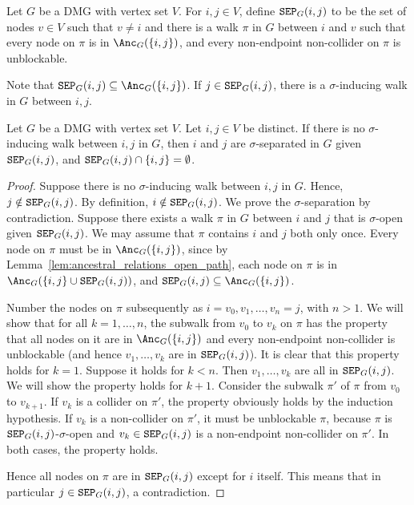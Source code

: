 \begin{Def}\label{def:DSEP}
  Let $G$ be a DMG with vertex set $V$. 
  For $i,j \in V$, define $\mathtt{SEP}_G(i,j)$ to be the set of nodes $v \in V$ such that
  $v \ne i$ and there is a walk $\pi$ in $G$ between $i$ and $v$ such that every node
  on $\pi$ is in $\Anc_G(\{i,j\})$, and 
  every non-endpoint non-collider on $\pi$ is unblockable.
\end{Def}
Note that $\SEP_G(i,j) \subseteq \Anc_G(\{i,j\})$.
If $j \in \mathtt{SEP}_G(i,j)$, there is a $\sigma$-inducing walk in $G$ between $i,j$.
\begin{Prp}\label{prp:DSEP}
  Let $G$ be a DMG with vertex set $V$.
  Let $i,j \in V$ be distinct.
  If there is no $\sigma$-inducing walk between $i,j$ in $G$, then $i$ and $j$ are $\sigma$-separated in $G$ given $\mathtt{SEP}_G(i,j)$,
  and $\mathtt{SEP}_G(i,j) \cap \{i,j\} = \emptyset$.
\end{Prp}
\begin{proof}
  Suppose there is no $\sigma$-inducing walk between $i,j$ in $G$.
  Hence, $j \notin \mathtt{SEP}_G(i,j)$.
  By definition, $i \notin \mathtt{SEP}_G(i,j)$.
  We prove the $\sigma$-separation by contradiction.
  Suppose there exists a walk $\pi$ in $G$ between $i$ and $j$ that is $\sigma$-open given $\mathtt{SEP}_G(i,j)$.
  We may assume that $\pi$ contains $i$ and $j$ both only once.
  Every node on $\pi$ must be in $\Anc_G(\{i,j\})$, since
  by Lemma~\ref{lem:ancestral_relations_open_path}, each node on $\pi$ is in $\Anc_G(\{i,j\} \cup \SEP_G(i,j))$,
  and $\SEP_G(i,j) \subseteq \Anc_G(\{i,j\})$.

  Number the nodes on $\pi$ subsequently as $i = v_0, v_1, \dots, v_n = j$, with $n > 1$.
  We will show that for all $k = 1,\dots,n$, the subwalk from $v_0$ to $v_k$ on $\pi$ has the property that all nodes on it are in $\Anc_G(\{i,j\})$ and every non-endpoint non-collider is unblockable (and hence $v_1,\dots,v_k$ are in $\mathtt{SEP}_G(i,j)$).
  It is clear that this property holds for $k=1$. 
  Suppose it holds for $k < n$.
  Then $v_1,\dots,v_k$ are all in $\mathtt{SEP}_G(i,j)$.
  We will show the property holds for $k+1$.
  Consider the subwalk $\pi'$ of $\pi$ from $v_0$ to $v_{k+1}$.
  If $v_{k}$ is a collider on $\pi'$, the property obviously holds by the induction hypothesis.
  If $v_{k}$ is a non-collider on $\pi'$, it must be unblockable $\pi$, because $\pi$ is $\mathtt{SEP}_G(i,j)$-$\sigma$-open and $v_k \in \mathtt{SEP}_G(i,j)$ is a non-endpoint non-collider on $\pi'$.
  In both cases, the property holds.

  Hence all nodes on $\pi$ are in $\mathtt{SEP}_G(i,j)$ except for $i$ itself.
  This means that in particular $j \in \mathtt{SEP}_G(i,j)$, a contradiction.
\end{proof}

